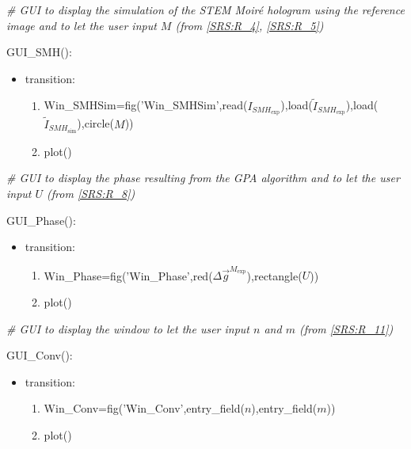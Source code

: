 \documentclass[12pt, titlepage]{article}
\begin{document}
\noindent\textit{{\#} GUI to display the simulation of the STEM Moir{\'e} hologram using the reference image and to let the user input $M$ (from \cref{SRS:R_4}, \cref{SRS:R_5})}\medskip

\noindent GUI{\_}SMH():
\begin{itemize}
\item transition: 
	\begin{enumerate}
	\item Win{\_}SMHSim=fig('Win{\_}SMHSim',read($I_{\mathit{SMH}_{\text{exp}}}$),load($\widetilde{I}_{\mathit{SMH}_{\text{exp}}}$),load($\widetilde{I}_{\mathit{SMH}_{\text{sim}}}$),circle($M$))
	\item plot()
	\end{enumerate} 
\end{itemize}
\bigskip

\noindent\textit{{\#} GUI to display the phase resulting from the GPA algorithm and to let the user input $U$ (from \cref{SRS:R_8})}\medskip

\noindent GUI{\_}Phase():
\begin{itemize}
\item transition: 
	\begin{enumerate}
	\item Win{\_}Phase=fig('Win{\_}Phase',red($\Delta \overrightarrow{g}^{M_{\text{exp}}}$),rectangle($U$))
	\item plot()
	\end{enumerate} 
\end{itemize}
\bigskip

\noindent\textit{{\#} GUI to display the window to let the user input $n$ and $m$ (from \cref{SRS:R_11})}\medskip

\noindent GUI{\_}Conv():
\begin{itemize}
\item transition: 
	\begin{enumerate}
	\item Win{\_}Conv=fig('Win{\_}Conv',entry{\_}field($n$),entry{\_}field($m$))
	\item plot()
	\end{enumerate} 
\end{itemize}
\bigskip

\iffalse
\noindent event{\_}GUI{\_}Mask():
\begin{itemize}
\item transition: Trigger event{\_}StrainCalc when button{\_}StrainCalc press
\end{itemize}
\bigskip
\noindent event{\_}GUI{\_}U():
\begin{itemize}
\item transition: Trigger event{\_}StrainCalc when button{\_}StrainCalc press
\end{itemize} 
\bigskip
\noindent event{\_}GUI{\_}nm():
\begin{itemize}
\item transition: Trigger event{\_}StrainCalc when button{\_}StrainCalc press
\end{itemize}  
\fi
\end{document}
